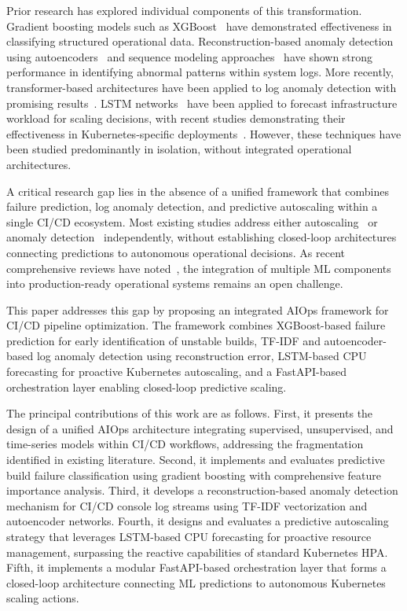 \documentclass[sn-nature]{sn-jnl}
\theoremstyle{thmstyleone}
\theoremstyle{thmstyletwo}
\theoremstyle{thmstylethree}
\begin{document}
Prior research has explored individual components of this transformation. Gradient boosting models such as XGBoost~\cite{chen2016xgboost} have demonstrated effectiveness in classifying structured operational data.
Reconstruction-based anomaly detection using autoencoders~\cite{sakurada2014anomaly} and sequence modeling approaches~\cite{du2017deeplog, meng2019loganomaly} have shown strong performance in identifying abnormal patterns within system logs.
More recently, transformer-based architectures have been applied to log anomaly detection with promising results~\cite{liao2025logtransformer, zhou2024logllm}.
LSTM networks~\cite{hochreiter1997lstm} have been applied to forecast infrastructure workload for scaling decisions, with recent studies demonstrating their effectiveness in Kubernetes-specific deployments~\cite{guruge2025prophet, dasilva2025adaptive}.
However, these techniques have been studied predominantly in isolation, without integrated operational architectures.

A critical research gap lies in the absence of a unified framework that combines failure prediction, log anomaly detection, and predictive autoscaling within a single CI/CD ecosystem.
Most existing studies address either autoscaling~\cite{lorido2014autoscaling, machiraju2026mlautoscaling} or anomaly detection~\cite{le2022log, kanahols2025timeseries} independently, without establishing closed-loop architectures connecting predictions to autonomous operational decisions.
As recent comprehensive reviews have noted~\cite{zota2025agentic, bayram2025trustworthy}, the integration of multiple ML components into production-ready operational systems remains an open challenge.

This paper addresses this gap by proposing an integrated AIOps framework for CI/CD pipeline optimization.
The framework combines XGBoost-based failure prediction for early identification of unstable builds, TF-IDF and autoencoder-based log anomaly detection using reconstruction error, LSTM-based CPU forecasting for proactive Kubernetes autoscaling, and a FastAPI-based orchestration layer enabling closed-loop predictive scaling.

The principal contributions of this work are as follows. First, it presents the design of a unified AIOps architecture integrating supervised, unsupervised, and time-series models within CI/CD workflows, addressing the fragmentation identified in existing literature.
Second, it implements and evaluates predictive build failure classification using gradient boosting with comprehensive feature importance analysis.
Third, it develops a reconstruction-based anomaly detection mechanism for CI/CD console log streams using TF-IDF vectorization and autoencoder networks.
Fourth, it designs and evaluates a predictive autoscaling strategy that leverages LSTM-based CPU forecasting for proactive resource management, surpassing the reactive capabilities of standard Kubernetes HPA.
Fifth, it implements a modular FastAPI-based orchestration layer that forms a closed-loop architecture connecting ML predictions to autonomous Kubernetes scaling actions.
\end{document}
